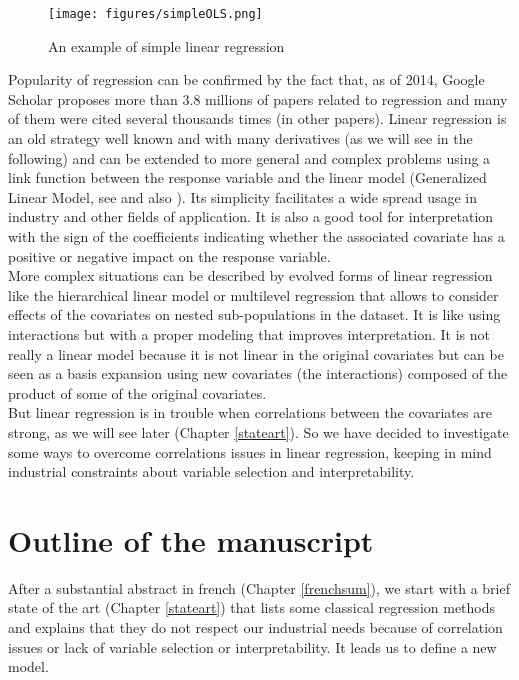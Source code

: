 \documentclass[12pt,a4paper]{report}
\begin{document}
\begin{figure}
\centering
	\texttt{[image: figures/simpleOLS.png]} 
	\caption{An example of simple linear regression}
\end{figure}		 
		 
		 Popularity of regression can be confirmed by the fact that, as of 2014, Google Scholar proposes more than $3.8$ millions of papers related to regression and many of them were cited several thousands times (in other papers). Linear regression is an old strategy well known and with many derivatives (as we will see in the following) and can be extended to more general and complex problems using a link function between the response variable and the linear model (Generalized Linear Model, see \cite{kiebel2003general,wickens2004general,nelder1972generalized} and also \cite{mccullagh1989generalized}). 
	Its simplicity facilitates a wide spread usage in industry and other fields of application. It is also a good tool for interpretation with the sign of the coefficients indicating whether the associated covariate has a positive or negative impact on the response variable. \\
	
	More complex situations can be described by evolved forms of linear regression like the hierarchical linear model \cite{raudenbush2002hierarchical,woltman2012introduction}  or  multilevel regression \cite{moerbeek2003comparison,maas2004robustness,hox1998multilevel} that allows to consider effects of the covariates on nested sub-populations in the dataset. It is like using interactions but with a proper modeling that improves interpretation. It is not really a linear model because it is not linear in the original covariates but can be seen as a basis expansion using new covariates (the interactions) composed of the product of some of the original covariates.\\
	
	But linear regression is in trouble when correlations between the covariates are strong, as we will see later (Chapter \ref{stateart}). So we have decided to investigate some ways to overcome correlations issues in linear regression, keeping in mind industrial constraints about variable selection and interpretability.
	
	
	\section{Outline of the manuscript}%
		After a substantial abstract in french (Chapter \ref{frenchsum}), we start with a brief state of the art (Chapter \ref{stateart}) that lists some classical regression methods and explains that they do not respect our industrial needs because of correlation issues or lack of variable selection or interpretability. It leads us to define a new model.\\
		
\end{document}
